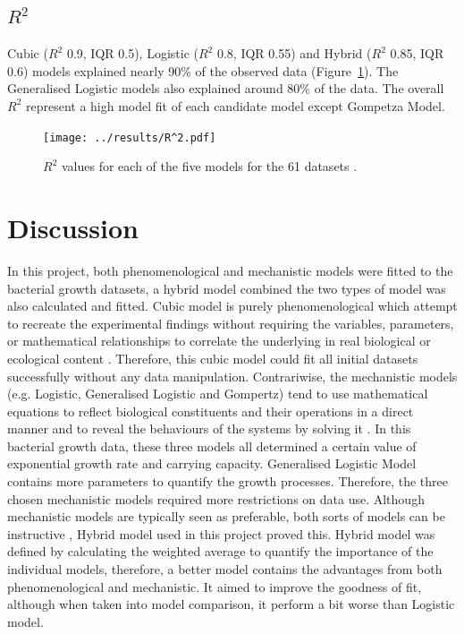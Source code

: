 \documentclass[a4paper]{report}
\begin{document}
\begin{linenumbers}
        \subsection{$R^2$}
        Cubic ($R^2$ 0.9, IQR 0.5), Logistic ($R^2$ 0.8, IQR 0.55) and Hybrid ($R^2$ 0.85, IQR 0.6) models explained nearly 90\% of the observed data (Figure~\ref{fig: R^2}). The Generalised Logistic models also explained around 80\% of the data. The overall $R^2$ represent a high model fit of each candidate model except Gompetza Model.
        \begin{figure}[h!]
            \centering
            \texttt{[image: ../results/R^2.pdf]}
            \caption{$R^2$ values for each of the five models for the 61 datasets .}
            \label{fig: R^2}
        \end{figure}

    \section{Discussion}
    In this project, both phenomenological and mechanistic models were fitted to the bacterial growth datasets, a hybrid model combined the two types of model was also calculated and fitted. Cubic model is purely phenomenological which attempt to recreate the experimental findings without requiring the variables, parameters, or mathematical relationships to correlate the underlying in real biological or ecological content \citep{van2011using}. Therefore, this cubic model could fit all initial datasets successfully without any data manipulation. Contrariwise, the mechanistic models (e.g. Logistic, Generalised Logistic and Gompertz) tend to use mathematical equations to reflect biological constituents and their operations in a direct manner and to reveal the behaviours of the systems by solving it \citep{van2011using, ferrer2009mathematical}. In this bacterial growth data, these three models all determined a certain value of exponential growth rate and carrying capacity. Generalised Logistic Model contains more parameters to quantify the growth processes. Therefore, the three chosen mechanistic models required more restrictions on data use. Although mechanistic models are typically seen as preferable, both sorts of models can be instructive \citep{van2011using}, Hybrid model used in this project proved this. Hybrid model was defined by calculating the weighted average to quantify the importance of the individual models, therefore, a better model contains the advantages from both phenomenological and mechanistic. It aimed to improve the goodness of fit, although when taken into model comparison, it perform a bit worse than Logistic model.
    

\end{linenumbers}
\end{document}
